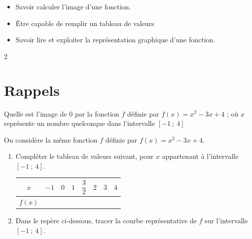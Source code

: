 \documentclass[10pt,a4paper]{article}
\begin{document}

\vspace{-0.3cm}

\begin{prerequis}
\begin{itemize}
    \item Savoir calculer l'image d'une fonction.
    \item Être capable de remplir un tableau de valeurs
    \item Savoir lire et exploiter la représentation graphique d'une fonction.
\end{itemize}
\end{prerequis}

\begin{multicols}{2}

\section{Rappels}
\begin{exo}[][]
    Quelle est l'image de 0 par la fonction \(f\) définie par \(f(x)=x^2-3x+4\) ; où \(x\) représente un nombre quelconque dans l'intervalle \([-1\ ;\ 4]\)
\end{exo}

\begin{exo}[][]
    On considère la même fonction \(f\) définie par \(f(x) = x^2-3x+4\).
    \begin{enumerate}
        \item Compléter le tableau de valeurs suivant, pour \(x\) appartenant à l'intervalle \([-1\ ;\ 4]\).

        \renewcommand{\arraystretch}{2}
        \begin{tabular}{|*{8}{c|}}
            \hline
            \(x\) & \(-1\) & \(0\) & \(1\) & \(\dfrac{3}{2}\) & \(2\) & \(3\) & \(4\) \\
            \hline
            \(f(x)\) & & & & & & & \\
            \hline
        \end{tabular}

        \item Dans le repère ci-dessous, tracer la courbe représentative de \(f\) sur l'intervalle \([-1\ ;\ 4]\).


\end{enumerate}
\end{exo}
\end{multicols}
\end{document}
